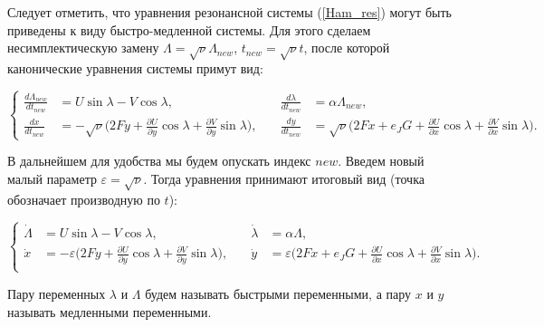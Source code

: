 Следует отметить, что уравнения резонансной системы (\ref{Ham_res}) могут быть приведены к виду быстро-медленной системы. Для этого сделаем несимплектическую замену $\Lambda = \sqrt \nu \Lambda_{new}$, $t_{new} = \sqrt \nu t$, после которой канонические уравнения системы примут вид:

\begin{equation*}
    \left\{
    \begin{aligned}
        \frac{d \Lambda_{new}}{dt_{new}} &= U  \sin \lambda - V \cos \lambda, 
        &\quad
        \frac{d \lambda}{dt_{new}} &= \alpha \Lambda_{new}, \\[1.5ex]
        \frac{dx}{dt_{new}} &= -\sqrt \nu \big( 2Fy+\frac{\partial U}{\partial y} \cos \lambda + \frac{\partial V}{\partial y} \sin \lambda \big), 
        &\quad
        \frac{dy}{dt_{new}} &= \sqrt \nu \big( 2Fx+e_JG +\frac{\partial U}{\partial x} \cos \lambda + \frac{\partial V}{\partial x} \sin \lambda \big).
    \end{aligned}
    \right.
\end{equation*}

В дальнейшем для удобства мы будем опускать индекс $new$. Введем новый малый параметр $\varepsilon = \sqrt \nu$. Тогда уравнения принимают итоговый вид (точка обозначает производную по $t$):

\begin{equation}
    \left\{
    \begin{aligned}
        \dot \Lambda &= U \sin \lambda - V \cos \lambda,
        &\quad
        \dot \lambda &= \alpha \Lambda, \\[1.5ex]
        \dot x &= -\varepsilon \big( 2Fy+\frac{\partial U}{\partial y} \cos \lambda + \frac{\partial V}{\partial y} \sin \lambda \big),
        &\quad
        \dot y &= \varepsilon \big( 2Fx+e_JG +\frac{\partial U}{\partial x} \cos \lambda + \frac{\partial V}{\partial x} \sin \lambda \big). \\
    \end{aligned}
    \right.
    \label{fullt}
\end{equation}

Пару переменных $\lambda$ и $\Lambda$ будем называть быстрыми переменными, а пару $x$ и $y$ называть медленными переменными.